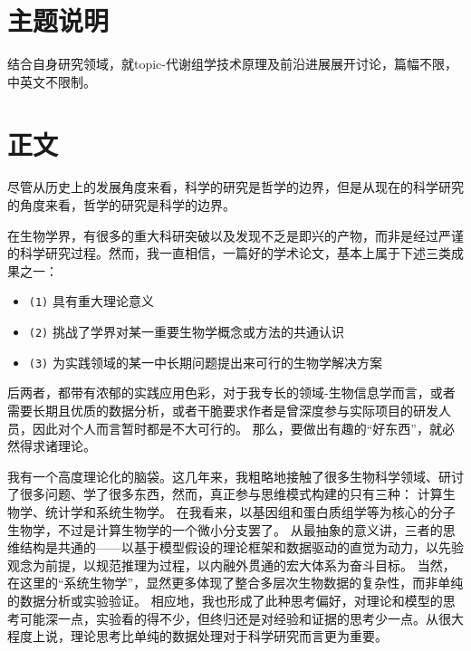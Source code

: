 \documentclass[12pt,hyperref,a4paper,UTF8]{ctexart}
\begin{document}
\cover

%
%

\thispagestyle{empty} %

\newpage
\tableofcontents

\newpage


\section{主题说明}

结合自身研究领域，就topic-代谢组学技术原理及前沿进展展开讨论，篇幅不限，中英文不限制。


\section{正文}

尽管从历史上的发展角度来看，科学的研究是哲学的边界，但是从现在的科学研究的角度来看，哲学的研究是科学的边界。

在生物学界，有很多的重大科研突破以及发现不乏是即兴的产物，而非是经过严谨的科学研究过程。然而，我一直相信，一篇好的学术论文，基本上属于下述三类成果之一：

\begin{itemize}
    \item \texttt{(1)} 具有重大理论意义
    \item \texttt{(2)} 挑战了学界对某一重要生物学概念或方法的共通认识
    \item \texttt{(3)} 为实践领域的某一中长期问题提出来可行的生物学解决方案
\end{itemize}

后两者，都带有浓郁的实践应用色彩，对于我专长的领域-生物信息学而言，或者需要长期且优质的数据分析，或者干脆要求作者是曾深度参与实际项目的研发人员，因此对个人而言暂时都是不大可行的。
那么，要做出有趣的“好东西”，就必然得求诸理论。

我有一个高度理论化的脑袋。这几年来，我粗略地接触了很多生物科学领域、研讨了很多问题、学了很多东西，然而，真正参与思维模式构建的只有三种：
计算生物学、统计学和系统生物学。
在我看来，以基因组和蛋白质组学等为核心的分子生物学，不过是计算生物学的一个微小分支罢了。
从最抽象的意义讲，三者的思维结构是共通的——以基于模型假设的理论框架和数据驱动的直觉为动力，以先验观念为前提，以规范推理为过程，以内融外贯通的宏大体系为奋斗目标。
当然，在这里的“系统生物学”，显然更多体现了整合多层次生物数据的复杂性，而非单纯的数据分析或实验验证。
相应地，我也形成了此种思考偏好，对理论和模型的思考可能深一点，实验看的得不少，但终归还是对经验和证据的思考少一点。从很大程度上说，理论思考比单纯的数据处理对于科学研究而言更为重要。
\end{document}
